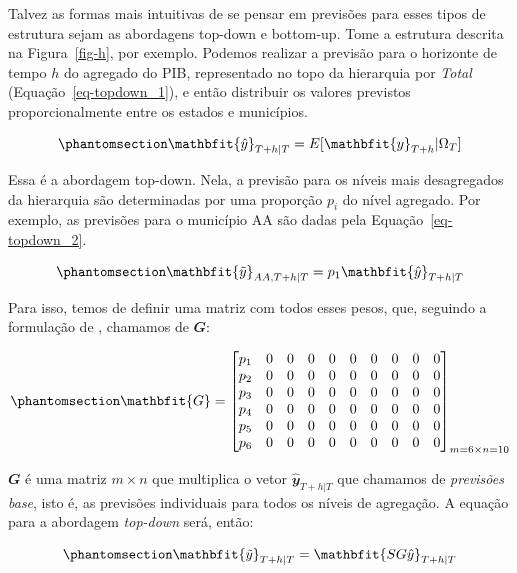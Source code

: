 \documentclass[
  12pt,
  twoside,
  openright,
  a4paper,
  chapter=TITLE,
  section=TITLE,
  brazil]{abntex2}
\begin{document}
Talvez as formas mais intuitivas de se pensar em previsões para esses
tipos de estrutura sejam as abordagens top-down e bottom-up. Tome a
estrutura descrita na Figura~\ref{fig-h}, por exemplo. Podemos realizar
a previsão para o horizonte de tempo \(h\) do agregado do PIB,
representado no topo da hierarquia por \emph{Total}
(Equação~\ref{eq-topdown_1}), e então distribuir os valores previstos
proporcionalmente entre os estados e municípios.

\begin{equation}\phantomsection\label{eq-topdown_1}{
\mathbfit{\hat{y}}_{T+h | T} = E[\mathbfit{y}_{T+h} | \Omega_T]
}\end{equation}

Essa é a abordagem top-down. Nela, a previsão para os níveis mais
desagregados da hierarquia são determinadas por uma proporção \(p_i\) do
nível agregado. Por exemplo, as previsões para o município AA são dadas
pela Equação~\ref{eq-topdown_2}.

\begin{equation}\phantomsection\label{eq-topdown_2}{
\mathbfit{\tilde{y}}_{AA, T+h | T} = p_{1}\mathbfit{\hat{y}}_{T+h | T}
}\end{equation}

Para isso, temos de definir uma matriz com todos esses pesos, que,
seguindo a formulação de \textcite{hyndman_forecasting_2021}, chamamos
de \(\mathbfit{G}\):

\begin{equation}\phantomsection\label{eq-matriz_g}{
\mathbfit{G}
=
\begin{bmatrix}
    p_1 & 0 & 0 & 0 & 0 & 0 & 0 & 0 & 0 & 0 \\
    p_2 & 0 & 0 & 0 & 0 & 0 & 0 & 0 & 0 & 0 \\
    p_3 & 0 & 0 & 0 & 0 & 0 & 0 & 0 & 0 & 0 \\
    p_4 & 0 & 0 & 0 & 0 & 0 & 0 & 0 & 0 & 0 \\
    p_5 & 0 & 0 & 0 & 0 & 0 & 0 & 0 & 0 & 0 \\
    p_6 & 0 & 0 & 0 & 0 & 0 & 0 & 0 & 0 & 0
\end{bmatrix}_{m=6 \times n=10}
}\end{equation}

\(\mathbfit{G}\) é uma matriz \(m \times n\) que multiplica o vetor
\(\hat{\mathbfit{y}}_{T+h|T}\) que chamamos de \emph{previsões base},
isto é, as previsões individuais para todos os níveis de agregação. A
equação para a abordagem \emph{top-down} será, então:

\begin{equation}\phantomsection\label{eq-topdown_3}{
\mathbfit{\tilde{y}}_{T+h | T} = \mathbfit{SG\hat{y}}_{T+h | T}
}\end{equation}
\end{document}
